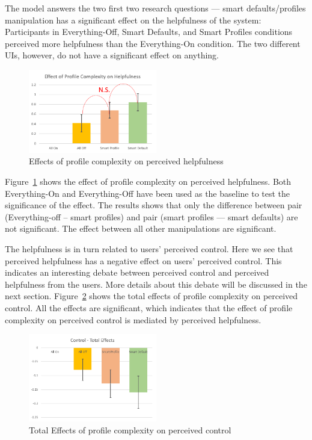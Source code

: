 The model answers the two first two research questions --- smart defaults/profiles manipulation has a significant effect on the helpfulness of the system: Participants in Everything-Off, Smart Defaults, and Smart Profiles conditions perceived more helpfulness than the Everything-On condition. The two different UIs, however, do not have a significant effect on anything.

\begin{figure}
	\centering
	\includegraphics[width=0.5\textwidth]{figures/effectonhelpfulness.png}
	\caption{Effects of profile complexity on perceived helpfulness}
	\label{fig:effectonhelpfulness}
\end{figure}

Figure~\ref{fig:effectonhelpfulness} shows the effect of profile complexity on perceived helpfulness. Both Everything-On and Everything-Off have been used as the baseline to test the significance of the effect. The results shows that only the difference between pair (Everything-off -- smart profiles) and pair (smart profiles --- smart defaults) are not significant. The effect between all other manipulations are significant.

The helpfulness is in turn related to users' perceived control. Here we see that perceived helpfulness has a negative effect on users' perceived control. This indicates an interesting debate between perceived control and perceived helpfulness from the users. More details about this debate will be discussed in the next section. Figure~\ref{fig:effectoncontrol} shows the total effects of profile complexity on perceived control. All the effects are significant, which indicates that the effect of profile complexity on perceived control is mediated by perceived helpfulness. 

\begin{figure}[ht]
	\centering
	\includegraphics[width=0.5\textwidth]{figures/effectoncontrol.png}
	\caption{Total Effects of profile complexity on perceived control}
	\label{fig:effectoncontrol}
\end{figure}

